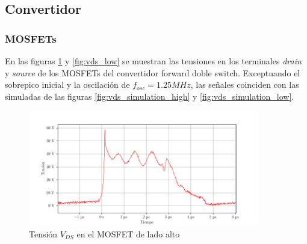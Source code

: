 









\subsection{Convertidor}

\subsubsection{MOSFETs}



En las figuras \ref{fig:vds_high} y \ref{fig:vds_low} se muestran las tensiones en los terminales \textit{drain} y \textit{source} de los MOSFETs del convertidor forward doble switch.
Exceptuando el sobrepico inicial y la oscilación de $f_{osc}=1.25MHz$, las señales coinciden con las simuladas de las figuras \ref{fig:vds_simulation_high} y \ref{fig:vds_simulation_low}. 

\begin{figure}[H]
    \centering
    \includegraphics[width=0.9\textwidth]{images/capturas-osciloscopio/17-11-2022/33.png}
    \caption{Tensión $V_{DS}$ en el MOSFET de lado alto}
    \label{fig:vds_high}
\end{figure}

